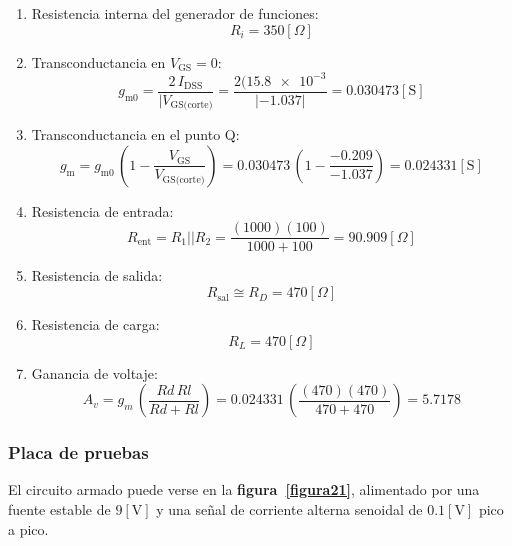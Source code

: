 \begin{enumerate}
\item Resistencia interna del generador de funciones:
\begin{equation*}
    R_i = 350[\Omega]
\end{equation*}
\item Transconductancia en $V_{\text{GS}} = 0$:
\begin{equation*}
    g_{\text{m0}} = \frac{2\,I_{\text{DSS}}}{|V_{\text{GS(corte)}}}
                  = \frac{2(\num{15.8e-3}}{|-1.037|}
                  = 0.030473[\text{S}]
\end{equation*}
\item Transconductancia en el punto Q:
\begin{equation*}
    g_{\text{m}} = g_{\text{m0}}\,\left(1 - \frac{V_{\text{GS}}}{V_{\text{GS(corte)}}}\right)
                 = 0.030473\,\left(1 - \frac{-0.209}{-1.037}\right)
                 = 0.024331[\text{S}]
\end{equation*}
\item Resistencia de entrada:
\begin{equation*}
    R_{\text{ent}} = R_1 || R_2
                   = \frac{(1000)(100)}{1000+100}
                   = 90.909[\Omega]
\end{equation*}
\item Resistencia de salida:
\begin{equation*}
    R_{\text{sal}} \cong R_D
                   = 470[\Omega]
\end{equation*}
\item Resistencia de carga:
\begin{equation*}
    R_L = 470[\Omega]
\end{equation*}
\item Ganancia de voltaje:
\begin{equation*}
    A_v = g_m\,\left(\frac{Rd\,Rl}{Rd+Rl}\right)
        = 0.024331\,\left(\frac{(470)(470)}{470+470}\right)
        = 5.7178
\end{equation*}
\end{enumerate}

\subsubsection{Placa de pruebas}
El circuito armado puede verse en la \textbf{figura~\ref{figura21}}, alimentado
por una fuente estable de $9[\text{V}]$ y una señal de corriente alterna
senoidal de $0.1[\text{V}]$ pico a pico.

